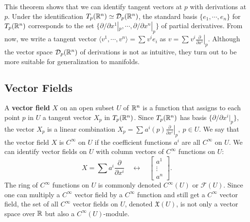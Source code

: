     This theorem shows that we can identify tangent vectors at $p$ with derivations at $p$. Under the identification $T_p(\mathbb{R}^n )\simeq \mathcal{D} _p (\mathbb{R}^n )$, the standard basis $\{e_1,\cdots ,e_n \} $ for $T_p(\mathbb{R}^n )$ corresponds to the set $\{\partial /\partial x^1|_p,\cdots ,\partial /\partial x^n |_p\}$ of partial derivatives. From now, we write a tangent vector $\langle v^1,\cdots ,v^n  \rangle =\sum_{}^{} v^i e_i $ as $v=\sum_{}^{} v^i  \left. \frac{\partial }{\partial x^i } \right| _p$. Although the vector space $\mathcal{D} _p(\mathbb{R}^n )$ of derivations is not as intuitive, they turn out to be more suitable for generalization to manifolds.

\subsection{Vector Fields}
A \textbf{vector field} $X$ on an open subset $U$ of $\mathbb{R}^n $ is a function that assigns to each point $p$ in $U$ a tangent vector $X_p$ in $T_p(\mathbb{R}^n )$. Since $T_p(\mathbb{R}^n )$ has basis $\{\partial /\partial x^i |_p\} $, the vector $X_p$ is a linear combination $
    X_p = \sum_{}^{} a^i (p) \left. \frac{\partial }{\partial x^i } \right| _p, \ p \in U.$ We say that the vector field $X$ is $C^{\infty}$ on $U$ if the coefficient functions $a^i $ are all $C^{\infty}$ on $U$.
We can identify vector fields on $U$ with column vectors of $C^{\infty}$ functions on $U$: \[
X=\sum a^i  \frac{\partial }{\partial x^i }\quad \longleftrightarrow \quad
\begin{bmatrix}
    a^1\\ \vdots \\ a^n 
\end{bmatrix}.
\] The ring of $C^{\infty}$ functions on $U$ is commonly denoted $C^{\infty}(U)$ or $\mathcal{F} (U)$. Since one can multiply a $C^{\infty}$ vector field by a $C^{\infty}$ function and still get a $C^{\infty}$ vector field, the set of all $C^{\infty}$ vector fields on $U$, denoted $\mathfrak X (U)$, is not only a vector space over $\mathbb{R}$ but also a $C^{\infty}(U)$-module. 
